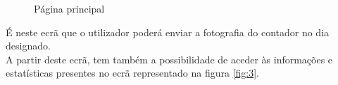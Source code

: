\begin{figure}[ht!]
\centering
{}
\caption{Página principal}
\label{fig:2}
\end{figure}

É neste ecrã que o utilizador poderá enviar a fotografia do contador no dia designado. \\
A partir deste ecrã, tem também a possibilidade de aceder às informações e estatísticas presentes no ecrã representado na figura \ref{fig:3}. 


